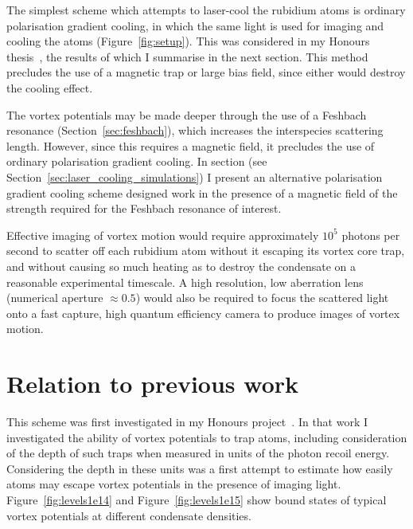 The simplest scheme which attempts to laser-cool the rubidium atoms is ordinary polarisation gradient cooling, in which the same light is used for imaging and cooling the atoms (Figure~\ref{fig:setup}). This was considered in my Honours thesis~\cite{billington_particle_2010}, the results of which I summarise in the next section. This method precludes the use of a magnetic trap or large bias field, since either would destroy the cooling effect.

The vortex potentials may be made deeper through the use of a Feshbach resonance (Section~\ref{sec:feshbach}), which increases the interspecies scattering length. However, since this requires a magnetic field, it precludes the use of ordinary polarisation gradient cooling. In section (see Section~\ref{sec:laser_cooling_simulations}) I present an alternative polarisation gradient cooling scheme designed work in the presence of a magnetic field of the strength required for the Feshbach resonance of interest.

Effective imaging of vortex motion would require approximately $10^5$ photons per second to scatter off each rubidium atom without it escaping its vortex core trap, and without causing so much heating as to destroy the condensate on a reasonable experimental timescale. A high resolution, low aberration lens (numerical aperture $\approx 0.5$) would also be required to focus the scattered light onto a fast capture, high quantum efficiency camera to produce images of vortex motion.

\section{Relation to previous work}

This scheme was first investigated in my Honours project~\cite{billington_particle_2010}. In that work I investigated the ability of vortex potentials to trap atoms, including consideration of the depth of such traps when measured in units of the photon recoil energy. Considering the depth in these units was a first attempt to estimate how easily atoms may escape vortex potentials in the presence of imaging light. Figure~\ref{fig:levels1e14} and Figure~\ref{fig:levels1e15} show bound states of typical vortex potentials at different condensate densities.

